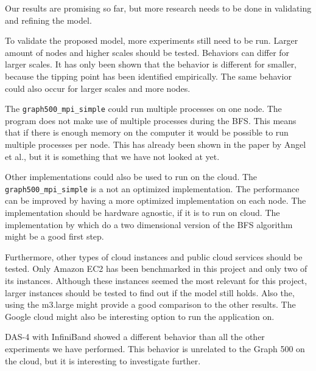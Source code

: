 Our results are promising so far, but more research needs to be done in validating and refining the model.

To validate the proposed model, more experiments still need to be run. Larger amount of nodes and higher scales should be tested. Behaviors can differ for larger scales. It has only been shown that the behavior is different for smaller, because the tipping point has been identified empirically. The same behavior could also occur for larger scales and more nodes.

The \texttt{graph500\_mpi\_simple} could run multiple processes on one node. The program does not make use of multiple processes during the BFS. This means that if there is enough memory on the computer it would be possible to run multiple processes per node. This has already been shown in the paper by Angel et al.\cite{angel2012graph}, but it is something that we have not looked at yet.

Other implementations could also be used to run on the cloud. The \texttt{graph500\_mpi\_simple} is a not an optimized implementation. The performance can be improved by having a more optimized implementation on each node. The implementation should be hardware agnostic, if it is to run on cloud. The implementation by \cite{ueno2012highly} which do a two dimensional version of the BFS algorithm might be a good first step.
 
Furthermore, other types of cloud instances and public cloud services should be tested. Only Amazon EC2 has been benchmarked in this project and only two of its instances. Although these instances seemed the most relevant for this project, larger instances should be tested to find out if the model still holds. Also the, using the m3.large might provide a good comparison to the other results. The Google cloud might also be interesting option to run the application on.

DAS-4 with InfiniBand showed a different behavior than all the other experiments we have performed. This behavior is unrelated to the Graph 500 on the cloud, but it is interesting to investigate further.